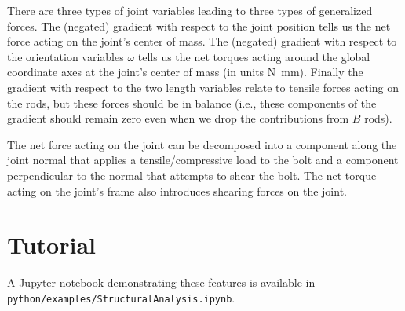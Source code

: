 \documentclass[10pt]{article}
\begin{document}
There are three types of joint variables leading to three types of generalized forces. The (negated) gradient with respect to the joint
position tells us the net force acting on the joint's center of mass. The (negated) gradient with respect to the orientation variables
$\omega$ tells us the net torques acting around the global coordinate axes at the joint's center of mass (in units \si{\newton \milli\meter}).
Finally the gradient with respect to the two length variables relate to tensile forces acting on the rods, but these forces should
be in balance (i.e., these components of the gradient should remain zero even when we drop the contributions from $B$ rods).

The net force acting on the joint can be decomposed into a component along the joint normal that applies a tensile/compressive load
to the bolt and a component perpendicular to the normal that attempts to shear the bolt. The net torque acting on the joint's frame
also introduces shearing forces on the joint.

\section{Tutorial}
A Jupyter notebook demonstrating these features is available in \texttt{python/examples/StructuralAnalysis.ipynb}.
\end{document}
